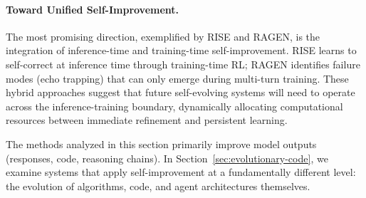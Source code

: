 \paragraph{Toward Unified Self-Improvement.}
The most promising direction, exemplified by RISE and RAGEN, is the integration of inference-time and training-time self-improvement. RISE learns to self-correct at inference time through training-time RL; RAGEN identifies failure modes (echo trapping) that can only emerge during multi-turn training. These hybrid approaches suggest that future self-evolving systems will need to operate across the inference-training boundary, dynamically allocating computational resources between immediate refinement and persistent learning.

The methods analyzed in this section primarily improve model outputs (responses, code, reasoning chains). In Section~\ref{sec:evolutionary-code}, we examine systems that apply self-improvement at a fundamentally different level: the evolution of algorithms, code, and agent architectures themselves.
